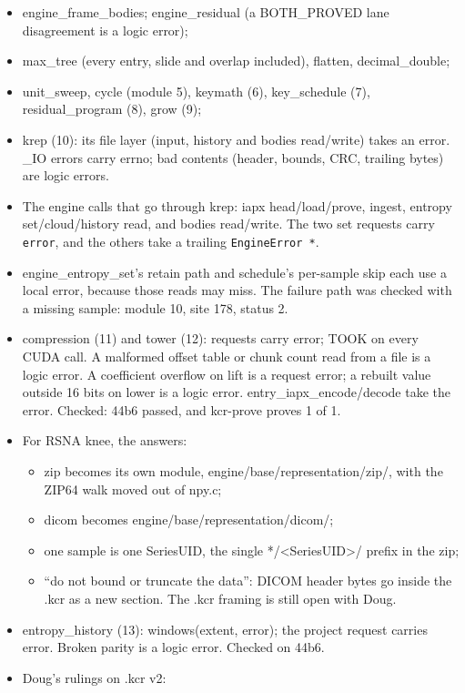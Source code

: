\begin{itemize}
\item engine\_\allowbreak{}frame\_\allowbreak{}bodies; engine\_\allowbreak{}residual (a BOTH\_\allowbreak{}PROVED lane disagreement is a logic error);
\item max\_\allowbreak{}tree (every entry, slide and overlap included), flatten, decimal\_\allowbreak{}double;
\item unit\_\allowbreak{}sweep, cycle (module 5), keymath (6), key\_\allowbreak{}schedule (7), residual\_\allowbreak{}program (8), grow (9);
\item krep (10): its file layer (input, history and bodies read/write) takes an error. \_\allowbreak{}IO errors carry errno; bad contents (header, bounds, CRC, trailing bytes) are logic errors.
\item The engine calls that go through krep: iapx head/load/prove, ingest, entropy set/cloud/history read, and bodies read/write. The two set requests carry \texttt{error}, and the others take a trailing \texttt{Engine\allowbreak{}Error *}.
\item engine\_\allowbreak{}entropy\_\allowbreak{}set's retain path and schedule's per-sample skip each use a local error, because those reads may miss. The failure path was checked with a missing sample: module 10, site 178, status 2.
\item compression (11) and tower (12): requests carry error; TOOK on every CUDA call. A malformed offset table or chunk count read from a file is a logic error. A coefficient overflow on lift is a request error; a rebuilt value outside 16 bits on lower is a logic error. entry\_\allowbreak{}iapx\_\allowbreak{}encode/decode take the error. Checked: 44b6 passed, and kcr-prove proves 1 of 1.
\item For RSNA knee, the answers:

\begin{itemize}
\item zip becomes its own module, engine/base/representation/zip/, with the ZIP64 walk moved out of npy.c;
\item dicom becomes engine/base/representation/dicom/;
\item one sample is one SeriesUID, the single */<SeriesUID>/ prefix in the zip;
\item “do not bound or truncate the data”: DICOM header bytes go inside the .kcr as a new section. The .kcr framing is still open with Doug.
\end{itemize}
\item entropy\_\allowbreak{}history (13): windows(extent, error); the project request carries error. Broken parity is a logic error. Checked on 44b6.
\item Doug's rulings on .kcr v2:


\end{itemize}
